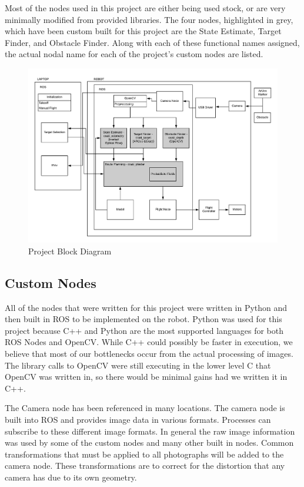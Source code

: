 \documentclass{article}[12]
\begin{document}
	Most of the nodes used in this project are either being used stock, or are very minimally modified from provided libraries. The four nodes, highlighted in grey, which have been custom built for this project are the State Estimate, Target Finder, and Obstacle Finder. Along with each of these functional names assigned, the actual nodal name for each of the project's custom nodes are listed.

	\begin{figure}[H]
		\centering
		\includegraphics[width=\linewidth]{BlockDiagram}
		\caption{Project Block Diagram}
		\label{fig:blockdiagram}
	\end{figure}

	\subsection{Custom Nodes}
	
 All of the nodes that were written for this project were written in Python and then built in ROS to be implemented on the robot. Python was used for this project because C++ and Python are the most supported languages for both ROS Nodes and OpenCV. While C++ could possibly be faster in execution, we believe that most of our bottlenecks occur from the actual processing of images. The library calls to OpenCV were still executing in the lower level C that OpenCV was written in, so there would be minimal gains had we written it in C++.
 
 The Camera node has been referenced in many locations. The camera node is built into ROS and provides image data in various formats. Processes can subscribe to these different image formats. In general the raw image information was used by some of the custom nodes and many other built in nodes. Common transformations that must be applied to all photographs will be added to the camera node. These transformations are to correct for the distortion that any camera has due to its own geometry.
	
\end{document}
